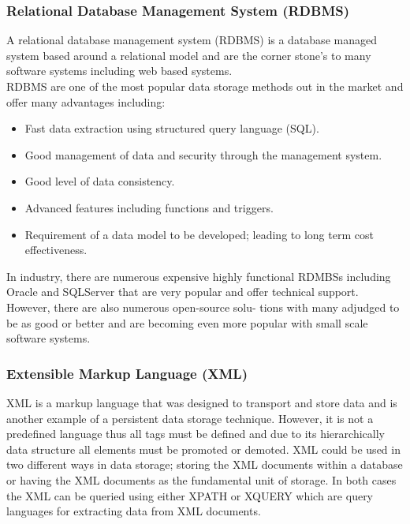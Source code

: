 \documentclass[12pt,a4paper]{article}
\begin{document}
\subsubsection{Relational Database Management System (RDBMS)}
	\label{Rel:RDBMS}
	A relational database management system (RDBMS) is a database managed system based around a
relational model and are the corner stone’s to many software systems including web based systems.\\
RDBMS are one of the most popular data storage methods out in the market and offer many advantages
including:\\
\begin{itemize}
	\item Fast data extraction using structured query language (SQL).
	\item Good management of data and security through the management system.
	\item Good level of data consistency.
	\item Advanced features including functions and triggers.
	\item Requirement of a data model to be developed; leading to long term cost effectiveness. 
\end{itemize}
In industry, there are numerous expensive highly functional RDMBSs including Oracle and SQLServer
that are very popular and offer technical support. However, there are also numerous open-source solu-
tions with many adjudged to be as good or better and are becoming even more popular with small
scale software systems.
\subsubsection{Extensible Markup Language (XML)}
	XML is a markup language that was designed to transport and store data and is another example of
a persistent data storage technique. However, it is not a predefined language thus all tags must be
defined and due to its hierarchically data structure all elements must be promoted or demoted.
XML could be used in two different ways in data storage; storing the XML documents within a
database or having the XML documents as the fundamental unit of storage. In both cases the XML
can be queried using either XPATH or XQUERY which are query languages for extracting data from
XML documents.
\end{document}
